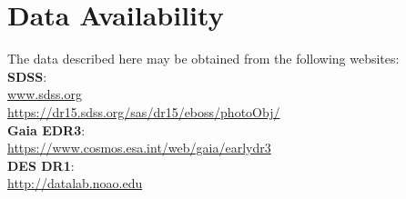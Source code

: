 \documentclass[fleqn,usenatbib]{mnras}
\begin{document}
\section*{Data Availability}
The data described here may be obtained from the following websites: \\
{\bf SDSS}:\\
\url{www.sdss.org}\\ 
\url{https://dr15.sdss.org/sas/dr15/eboss/photoObj/}\\
{\bf Gaia EDR3}:\\
\url{https://www.cosmos.esa.int/web/gaia/earlydr3}\\
{\bf DES DR1}:\\
\url{http://datalab.noao.edu}
 
















\bsp	%
\label{lastpage}
\end{document}
